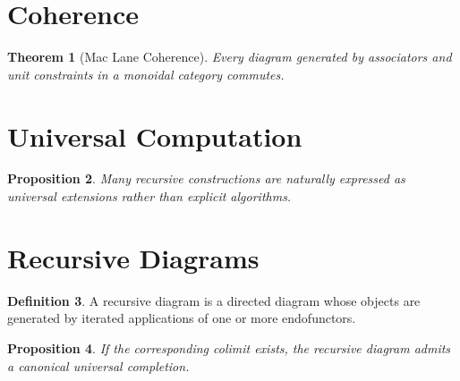 \documentclass[11pt]{book}
\numberwithin{equation}{chapter}
\theoremstyle{definition}
\newtheorem{definition}{Definition}[chapter]
\theoremstyle{plain}
\newtheorem{theorem}[definition]{Theorem}
\newtheorem{proposition}[definition]{Proposition}
\begin{document}

\section{Coherence}

\begin{theorem}[Mac Lane Coherence]

Every diagram generated by associators and unit constraints in a
monoidal category commutes.

\end{theorem}


\section{Universal Computation}

\begin{proposition}

Many recursive constructions are naturally expressed as universal
extensions rather than explicit algorithms.

\end{proposition}


\section{Recursive Diagrams}

\begin{definition}

A recursive diagram is a directed diagram whose objects are generated by
iterated applications of one or more endofunctors.

\end{definition}


\begin{proposition}

If the corresponding colimit exists, the recursive diagram admits a
canonical universal completion.

\end{proposition}

\end{document}
